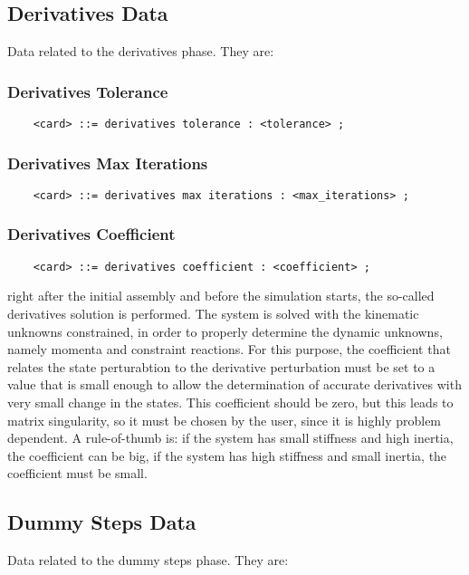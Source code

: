 \subsection{Derivatives Data}
Data related to the derivatives phase. They are:


\subsubsection{Derivatives Tolerance}
\begin{verbatim}
    <card> ::= derivatives tolerance : <tolerance> ;
\end{verbatim}

\subsubsection{Derivatives Max Iterations}
\begin{verbatim}
    <card> ::= derivatives max iterations : <max_iterations> ;
\end{verbatim}

\subsubsection{Derivatives Coefficient}
\begin{verbatim}
    <card> ::= derivatives coefficient : <coefficient> ;
\end{verbatim}
right after the initial assembly and before the simulation starts, the
so-called derivatives solution is performed. The system is solved with
the kinematic unknowns constrained, in order to properly determine the
dynamic unknowns, namely momenta and constraint reactions. For this
purpose, the coefficient that relates the state perturabtion to the
derivative perturbation must be set to a value that is small enough to
allow the determination of accurate derivatives with very small change
in the states. This coefficient should be zero, but this leads to matrix
singularity, so it must be chosen by the user, since it is highly
problem dependent. A rule-of-thumb is: if the system has small
stiffness and high inertia, the coefficient can be big, if the system
has high stiffness and small inertia, the coefficient must be small.


\subsection{Dummy Steps Data}
Data related to the dummy steps phase. They are:

